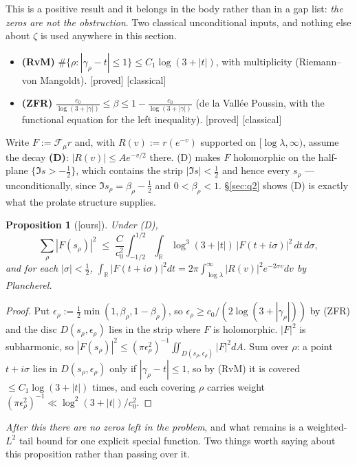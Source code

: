 \documentclass[11pt,a4paper]{article}
\theoremstyle{plain}
\newtheorem{proposition}[theorem]{Proposition}
\theoremstyle{definition}
\theoremstyle{remark}
\newcommand{\st}[1]{{\normalfont\sffamily\footnotesize[#1]}}
\newcommand{\proved}{\st{proved}}
\newcommand{\ours}{{\normalfont\sffamily\footnotesize[ours]}}
\newcommand{\theirs}[1]{{\normalfont\sffamily\footnotesize[#1]}}
\newcommand{\R}{\mathbb{R}}
\newcommand{\F}{\mathcal{F}}
\begin{document}
This is a positive result and it belongs in the body rather than in a gap list:
\emph{the zeros are not the obstruction}.  Two classical unconditional inputs,
and nothing else about $\zeta$ is used anywhere in this section.

\begin{itemize}\itemsep1pt
\item \textbf{(RvM)} $\#\{\rho:|\gamma_\rho-t|\le1\}\le C_1\log(3+|t|)$, with
multiplicity (Riemann--von Mangoldt). \proved{} \theirs{classical}
\item \textbf{(ZFR)} $\frac{c_0}{\log(3+|\gamma|)}\le\beta\le1-\frac{c_0}{\log(3+|\gamma|)}$
(de la Vall\'ee Poussin, with the functional equation for the left inequality).
\proved{} \theirs{classical}
\end{itemize}

\noindent Write $F:=\F_\mu r$ and, with $R(v):=r(e^{-v})$ supported on
$[\log\lambda,\infty)$, assume the decay
\textbf{(D)}: $|R(v)|\le Ae^{-v/2}$ there.  (D) makes $F$ holomorphic on the
half-plane $\{\Im s>-\tfrac12\}$, which contains the strip $|\Im s|<\tfrac12$
and hence every $s_\rho$ --- unconditionally, since $\Im s_\rho=\beta_\rho-\frac12$
and $0<\beta_\rho<1$.  \S\ref{sec:q2} shows (D) is exactly what the prolate
structure supplies.

\begin{proposition}[\ours]\label{prop:zetaside}
Under \textup{(D)},
\[
  \sum_\rho|F(s_\rho)|^2\;\le\;\frac{C}{c_0^2}\int_{-1/2}^{1/2}\!\!\int_\R
  \log^3(3+|t|)\,|F(t+i\sigma)|^2\,dt\,d\sigma ,
\]
and for each $|\sigma|<\tfrac12$, $\int_\R|F(t+i\sigma)|^2dt
=2\pi\int_{\log\lambda}^\infty|R(v)|^2e^{-2\sigma v}dv$ by Plancherel.
\end{proposition}

\begin{proof}
Put $\epsilon_\rho:=\tfrac12\min(1,\beta_\rho,1-\beta_\rho)$, so
$\epsilon_\rho\ge c_0/(2\log(3+|\gamma_\rho|))$ by (ZFR) and the disc
$D(s_\rho,\epsilon_\rho)$ lies in the strip where $F$ is holomorphic.  $|F|^2$
is subharmonic, so
$|F(s_\rho)|^2\le(\pi\epsilon_\rho^2)^{-1}\iint_{D(s_\rho,\epsilon_\rho)}|F|^2dA$.
Sum over $\rho$: a point $t+i\sigma$ lies in $D(s_\rho,\epsilon_\rho)$ only if
$|\gamma_\rho-t|\le1$, so by (RvM) it is covered $\le C_1\log(3+|t|)$ times, and
each covering $\rho$ carries weight
$(\pi\epsilon_\rho^2)^{-1}\ll\log^2(3+|t|)/c_0^2$.
\end{proof}

\emph{After this there are no zeros left in the problem}, and what remains is a
weighted-$L^2$ tail bound for one explicit special function.  Two things worth
saying about this proposition rather than passing over it.
\end{document}
